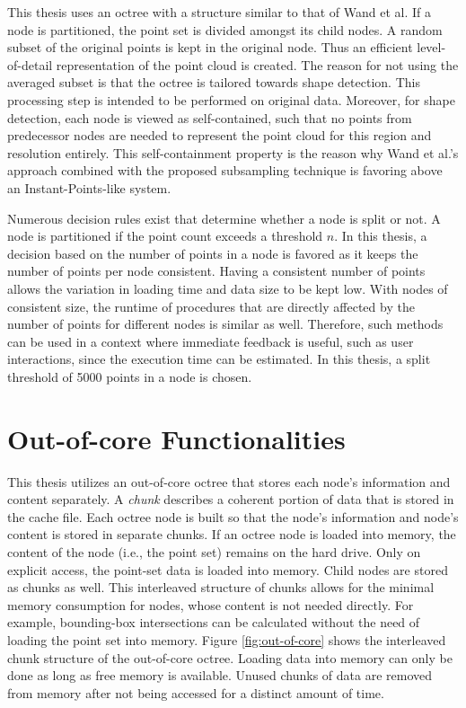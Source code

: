 This thesis uses an octree with a structure similar to that of Wand et al. If a node is partitioned, the point set is divided amongst its child nodes. A random subset of the original points is kept in the original node. Thus an efficient level-of-detail representation of the point cloud is created. 
The reason for not using the averaged subset is that the octree is tailored towards shape detection. This processing step is intended to be performed on original data. Moreover, for shape detection, each node is viewed as self-contained, such that no points from predecessor nodes are needed to represent the point cloud for this region and resolution entirely. This self-containment property is the reason why Wand et al.'s approach combined with the proposed subsampling technique is favoring above an Instant-Points-like system. 

\par

Numerous decision rules exist that determine whether a node is split or not. A node is partitioned if the point count exceeds a threshold $n$. In this thesis, a decision based on the number of points in a node is favored as it keeps the number of points per node consistent.
Having a consistent number of points allows the variation in loading time and data size to be kept low. With nodes of consistent size, the runtime of procedures that are directly affected by the number of points for different nodes is similar as well. Therefore, such methods can be used in a context where immediate feedback is useful, such as user interactions, since the execution time can be estimated. In this thesis, a split threshold of 5000 points in a node is chosen. 


\section{Out-of-core Functionalities}
\label{sec:octree_ooc}
This thesis utilizes an out-of-core octree that stores each node's information and content separately. A \textit{chunk} describes a coherent portion of data that is stored in the cache file. Each octree node is built so that the node's information and node's content is stored in separate chunks. If an octree node is loaded into memory, the content of the node (i.e., the point set) remains on the hard drive. Only on explicit access, the point-set data is loaded into memory. Child nodes are stored as chunks as well. This interleaved structure of chunks allows for the minimal memory consumption for nodes, whose content is not needed directly. For example, bounding-box intersections can be calculated without the need of loading the point set into memory. Figure \ref{fig:out-of-core} shows the interleaved chunk structure of the out-of-core octree. Loading data into memory can only be done as long as free memory is available. Unused chunks of data are removed from memory after not being accessed for a distinct amount of time.

